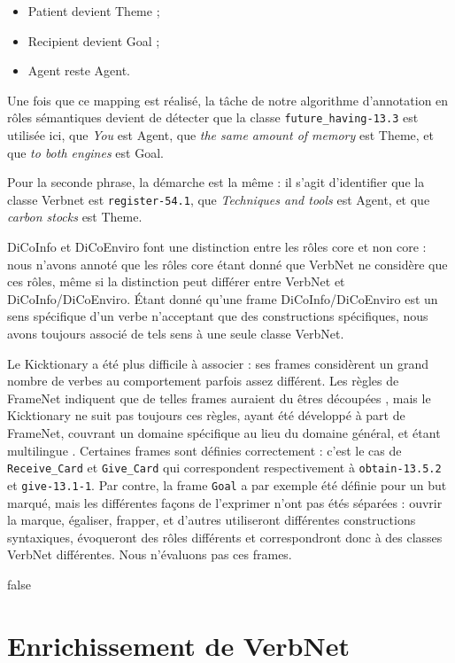 \begin{itemize}
    \item Patient devient Theme ;
    \item Recipient devient Goal ;
    \item Agent reste Agent.
\end{itemize}

Une fois que ce mapping est réalisé, la tâche de notre algorithme d'annotation
en rôles sémantiques devient de détecter que la classe \texttt{future\_having-13.3} est
utilisée ici, que \textit{You} est Agent, que \textit{the same amount of memory} est Theme,
et que \textit{to both engines} est Goal.

Pour la seconde phrase, la démarche est la même : il s'agit d'identifier que la
classe Verbnet est \texttt{register-54.1}, que \textit{Techniques and tools}
est Agent, et que \textit{carbon stocks} est Theme.

DiCoInfo et DiCoEnviro font une distinction entre les rôles core et non core :
nous n'avons annoté que les rôles core étant donné que VerbNet ne considère que
ces rôles, même si la distinction peut différer entre VerbNet et
DiCoInfo/DiCoEnviro. Étant donné qu'une frame DiCoInfo/DiCoEnviro est un sens
spécifique d'un verbe n'acceptant que des constructions spécifiques, nous avons
toujours associé de tels sens à une seule classe VerbNet.

Le Kicktionary a été plus difficile à associer : ses frames considèrent un
grand nombre de verbes au comportement parfois assez différent. Les règles de
FrameNet indiquent que de telles frames auraient du êtres découpées
\citep{ruppenhofer2006extended}, mais le Kicktionary ne suit pas toujours ces
règles, ayant été développé à part de FrameNet, couvrant un domaine spécifique
au lieu du domaine général, et étant multilingue
\citep{schmidt2006interfacing}. Certaines frames sont définies correctement :
c'est le cas de \texttt{Receive\_Card} et \texttt{Give\_Card} qui correspondent
respectivement à \texttt{obtain-13.5.2} et \texttt{give-13.1-1}. Par contre, la
frame \texttt{Goal} a par exemple été définie pour un but marqué, mais les
différentes façons de l'exprimer n'ont pas étés séparées : ouvrir la marque,
égaliser, frapper, et d'autres utiliseront différentes constructions
syntaxiques, évoqueront des rôles différents et correspondront donc à des
classes VerbNet différentes. Nous n'évaluons pas ces frames.

\if false

\section{Enrichissement de VerbNet}
\label{sec:enrichissement_verbnet}


